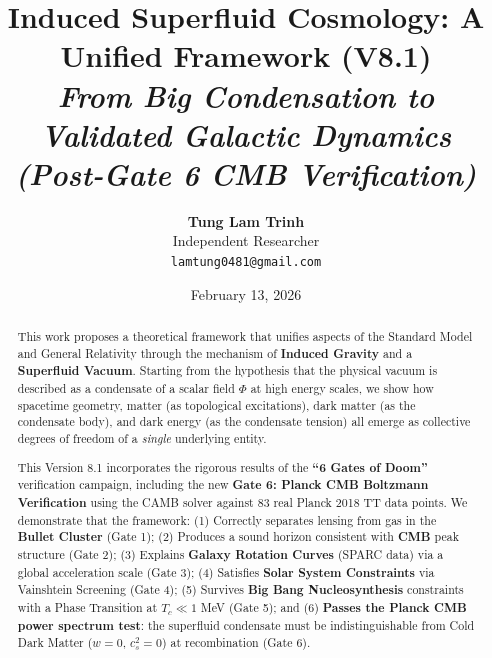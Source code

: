 \documentclass[a4paper,12pt]{article}
\title{\textbf{Induced Superfluid Cosmology: A Unified Framework (V8.1)}\\ \large \textit{From Big Condensation to Validated Galactic Dynamics\\(Post-Gate 6 CMB Verification)}}
\author{\textbf{Tung Lam Trinh} \\ Independent Researcher \\ \texttt{lamtung0481@gmail.com}}
\date{February 13, 2026}
\begin{document}
\maketitle

\begin{abstract}
This work proposes a theoretical framework that unifies aspects of the Standard Model and General Relativity through the mechanism of \textbf{Induced Gravity} and a \textbf{Superfluid Vacuum}. Starting from the hypothesis that the physical vacuum is described as a condensate of a scalar field $\Phi$ at high energy scales, we show how spacetime geometry, matter (as topological excitations), dark matter (as the condensate body), and dark energy (as the condensate tension) all emerge as collective degrees of freedom of a \textit{single} underlying entity.

This Version 8.1 incorporates the rigorous results of the \textbf{``6 Gates of Doom''} verification campaign, including the new \textbf{Gate 6: Planck CMB Boltzmann Verification} using the CAMB solver against 83 real Planck 2018 TT data points. We demonstrate that the framework:
(1) Correctly separates lensing from gas in the \textbf{Bullet Cluster} (Gate 1);
(2) Produces a sound horizon consistent with \textbf{CMB} peak structure (Gate 2);
(3) Explains \textbf{Galaxy Rotation Curves} (SPARC data) via a global acceleration scale (Gate 3);
(4) Satisfies \textbf{Solar System Constraints} via Vainshtein Screening (Gate 4);
(5) Survives \textbf{Big Bang Nucleosynthesis} constraints with a Phase Transition at $T_c \ll 1$ MeV (Gate 5); and
(6) \textbf{Passes the Planck CMB power spectrum test}: the superfluid condensate must be indistinguishable from Cold Dark Matter ($w=0$, $c_s^2=0$) at recombination (Gate 6).


\end{abstract}
\end{document}
